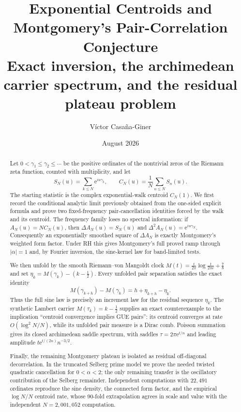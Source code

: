 \documentclass[11pt]{amsart}
\title[Exponential centroids and pair correlation]{Exponential Centroids and Montgomery's Pair-Correlation Conjecture\\
Exact inversion, the archimedean carrier spectrum, and the residual plateau problem}
\author{Víctor Casaña-Giner}
\date{August 2026}
\theoremstyle{definition}
\theoremstyle{remark}
\newcommand{\ee}{\mathrm e}
\begin{document}
\begin{abstract}
Let $0<\gamma_1\leq\gamma_2\leq\cdots$ be the positive ordinates of the
nontrivial zeros of the Riemann zeta function, counted with multiplicity, and
let
\[
S_N(u)=\sum_{k\leq N}\ee^{iu\gamma_k},
\qquad
C_N(u)=\frac1N\sum_{n\leq N}S_n(u).
\]
The starting statistic is the complex exponential-walk centroid $C_N(1)$.  We
first record the conditional analytic limit previously obtained from the
one-sided explicit formula and prove two fixed-frequency pair-cancellation
identities forced by the walk and its centroid.  The frequency family loses no
spectral information: if $A_N(u)=NC_N(u)$, then
$\Delta A_N(u)=S_N(u)$ and $\Delta^2A_N(u)=\ee^{iu\gamma_N}$.  Consequently an
exponentially smoothed square of $\Delta A_N$ is exactly Montgomery's weighted
form factor.  Under RH this gives Montgomery's full proved ramp through
$|\alpha|=1$ and, by Fourier inversion, the sine-kernel law for band-limited
tests.

We then unfold by the smooth Riemann--von Mangoldt clock
$M(t)=\frac{t}{2\pi}\log\frac{t}{2\pi\ee}+\frac78$ and set
$\eta_k=M(\gamma_k)-(k-\frac12)$.  Every unfolded pair separation satisfies the
exact identity
\[
M(\gamma_{k+h})-M(\gamma_k)=h+\eta_{k+h}-\eta_k.
\]
Thus the full sine law is precisely an increment law for the residual sequence
$\eta_k$.  The synthetic Lambert carrier $M(\tau_k)=k-\frac12$ supplies an exact
counterexample to the implication ``centroid convergence implies GUE pairs'':
its centroid converges at rate $O(\log^2N/N)$, while its unfolded pair measure
is a Dirac comb.  Poisson summation gives its closed archimedean saddle
spectrum, with saddles $\tau=2\pi\ee^{t/n}$ and leading amplitude
$t\ee^{t/(2n)}n^{-3/2}$.

Finally, the remaining Montgomery plateau is isolated as residual
off-diagonal decorrelation.  In the truncated Selberg prime model we prove the
needed twisted quadratic cancellation for $0<\alpha<2$; the only remaining
transfer is the oscillatory contribution of the Selberg remainder.  Independent
computations with $22{,}491$ ordinates reproduce the sine density, the connected
form factor, and the empirical $\log N/N$ centroid rate, whose 90-fold
extrapolation agrees in scale and value with the independent
$N=2{,}001{,}052$ computation.
\end{abstract}

\maketitle
\end{document}
